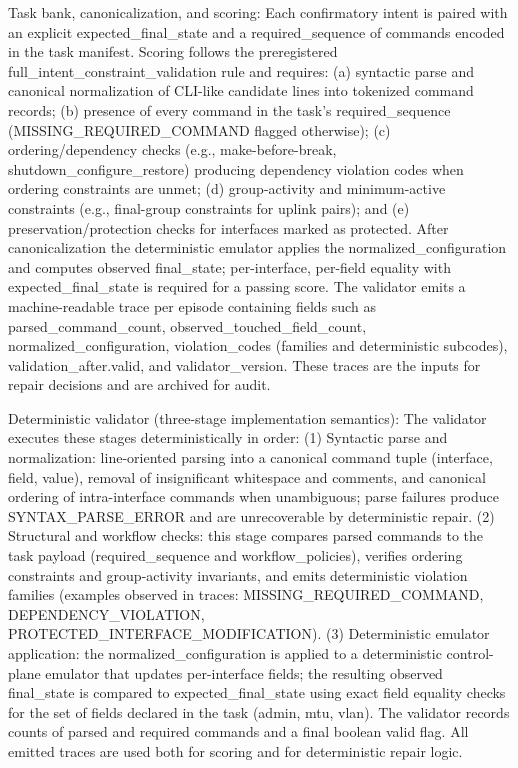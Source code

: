 \documentclass[conference]{IEEEtran}
\begin{document}
Task bank, canonicalization, and scoring: Each confirmatory intent is paired with an explicit expected\_final\_state and a required\_sequence of commands encoded in the task manifest. Scoring follows the preregistered full\_intent\_constraint\_validation rule and requires: (a) syntactic parse and canonical normalization of CLI-like candidate lines into tokenized command records; (b) presence of every command in the task's required\_sequence (MISSING\_REQUIRED\_COMMAND flagged otherwise); (c) ordering/dependency checks (e.g., make-before-break, shutdown\_configure\_restore) producing dependency violation codes when ordering constraints are unmet; (d) group-activity and minimum-active constraints (e.g., final-group constraints for uplink pairs); and (e) preservation/protection checks for interfaces marked as protected. After canonicalization the deterministic emulator applies the normalized\_configuration and computes observed final\_state; per-interface, per-field equality with expected\_final\_state is required for a passing score. The validator emits a machine-readable trace per episode containing fields such as parsed\_command\_count, observed\_touched\_field\_count, normalized\_configuration, violation\_codes (families and deterministic subcodes), validation\_after.valid, and validator\_version. These traces are the inputs for repair decisions and are archived for audit.

Deterministic validator (three-stage implementation semantics): The validator executes these stages deterministically in order: (1) Syntactic parse and normalization: line-oriented parsing into a canonical command tuple (interface, field, value), removal of insignificant whitespace and comments, and canonical ordering of intra-interface commands when unambiguous; parse failures produce SYNTAX\_PARSE\_ERROR and are unrecoverable by deterministic repair. (2) Structural and workflow checks: this stage compares parsed commands to the task payload (required\_sequence and workflow\_policies), verifies ordering constraints and group-activity invariants, and emits deterministic violation families (examples observed in traces: MISSING\_REQUIRED\_COMMAND, DEPENDENCY\_VIOLATION, PROTECTED\_INTERFACE\_MODIFICATION). (3) Deterministic emulator application: the normalized\_configuration is applied to a deterministic control-plane emulator that updates per-interface fields; the resulting observed final\_state is compared to expected\_final\_state using exact field equality checks for the set of fields declared in the task (admin, mtu, vlan). The validator records counts of parsed and required commands and a final boolean valid flag. All emitted traces are used both for scoring and for deterministic repair logic.
\end{document}
